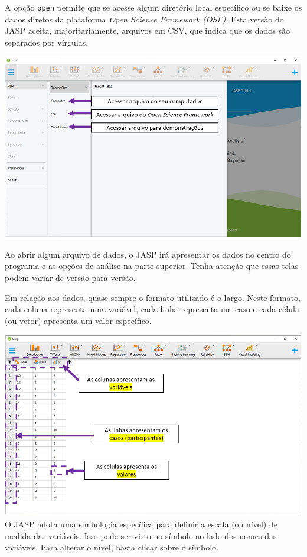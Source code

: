 \documentclass[
]{book}
\begin{document}
A opção \texttt{open} permite que se acesse algum diretório local específico ou se baixe os dados diretos da plataforma \emph{Open Science Framework (OSF)}. Esta versão do JASP aceita, majoritariamente, arquivos em CSV, que indica que os dados são separados por vírgulas.

\includegraphics{./img/cap_jasp_abrir2.png}

Ao abrir algum arquivo de dados, o JASP irá apresentar os dados no centro do programa e as opções de análise na parte superior. Tenha atenção que essas telas podem variar de versão para versão.

Em relação aos dados, quase sempre o formato utilizado é o largo. Neste formato, cada coluna representa uma variável, cada linha representa um caso e cada célula (ou vetor) apresenta um valor específico.

\includegraphics{./img/cap_jasp_dados.png}
O JASP adota uma simbologia específica para definir a escala (ou nível) de medida das variáveis. Isso pode ser visto no símbolo ao lado dos nomes das variáveis. Para alterar o nível, basta clicar sobre o símbolo.
\end{document}
